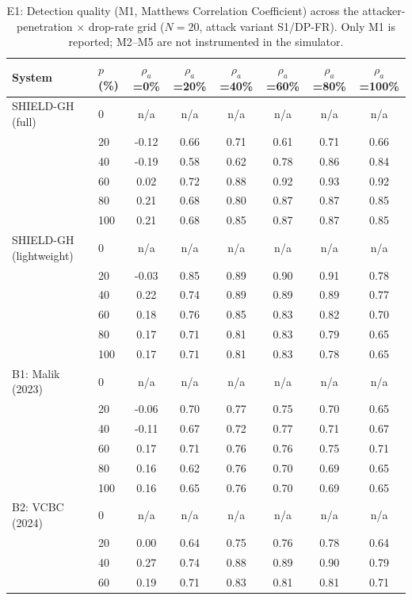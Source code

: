\begin{table}[H]
\centering\small
\caption{E1: Detection quality (M1, Matthews Correlation Coefficient) across the attacker-penetration $\times$ drop-rate grid ($N=20$, attack variant S1/DP-FR). Only M1 is reported; M2--M5 are not instrumented in the simulator.}
\label{tab:e1_mcc}
\begin{tabular}{|l|l|c|c|c|c|c|c|}
\hline
\textbf{System} & \textbf{$p$ (\%)} & $\rho_a$=0\% & $\rho_a$=20\% & $\rho_a$=40\% & $\rho_a$=60\% & $\rho_a$=80\% & $\rho_a$=100\% \\
\hline
SHIELD-GH (full) & 0 & n/a & n/a & n/a & n/a & n/a & n/a \\
 & 20 & -0.12 & 0.66 & 0.71 & 0.61 & 0.71 & 0.66 \\
 & 40 & -0.19 & 0.58 & 0.62 & 0.78 & 0.86 & 0.84 \\
 & 60 & 0.02 & 0.72 & 0.88 & 0.92 & 0.93 & 0.92 \\
 & 80 & 0.21 & 0.68 & 0.80 & 0.87 & 0.87 & 0.85 \\
 & 100 & 0.21 & 0.68 & 0.85 & 0.87 & 0.87 & 0.85 \\
\hline
SHIELD-GH (lightweight) & 0 & n/a & n/a & n/a & n/a & n/a & n/a \\
 & 20 & -0.03 & 0.85 & 0.89 & 0.90 & 0.91 & 0.78 \\
 & 40 & 0.22 & 0.74 & 0.89 & 0.89 & 0.89 & 0.77 \\
 & 60 & 0.18 & 0.76 & 0.85 & 0.83 & 0.82 & 0.70 \\
 & 80 & 0.17 & 0.71 & 0.81 & 0.83 & 0.79 & 0.65 \\
 & 100 & 0.17 & 0.71 & 0.81 & 0.83 & 0.78 & 0.65 \\
\hline
B1: Malik (2023) & 0 & n/a & n/a & n/a & n/a & n/a & n/a \\
 & 20 & -0.06 & 0.70 & 0.77 & 0.75 & 0.70 & 0.65 \\
 & 40 & -0.11 & 0.67 & 0.72 & 0.77 & 0.71 & 0.67 \\
 & 60 & 0.17 & 0.71 & 0.76 & 0.76 & 0.75 & 0.71 \\
 & 80 & 0.16 & 0.62 & 0.76 & 0.70 & 0.69 & 0.65 \\
 & 100 & 0.16 & 0.65 & 0.76 & 0.70 & 0.69 & 0.65 \\
\hline
B2: VCBC (2024) & 0 & n/a & n/a & n/a & n/a & n/a & n/a \\
 & 20 & 0.00 & 0.64 & 0.75 & 0.76 & 0.78 & 0.64 \\
 & 40 & 0.27 & 0.74 & 0.88 & 0.89 & 0.90 & 0.79 \\
 & 60 & 0.19 & 0.71 & 0.83 & 0.81 & 0.81 & 0.71 \\

\end{tabular}
\end{table}

